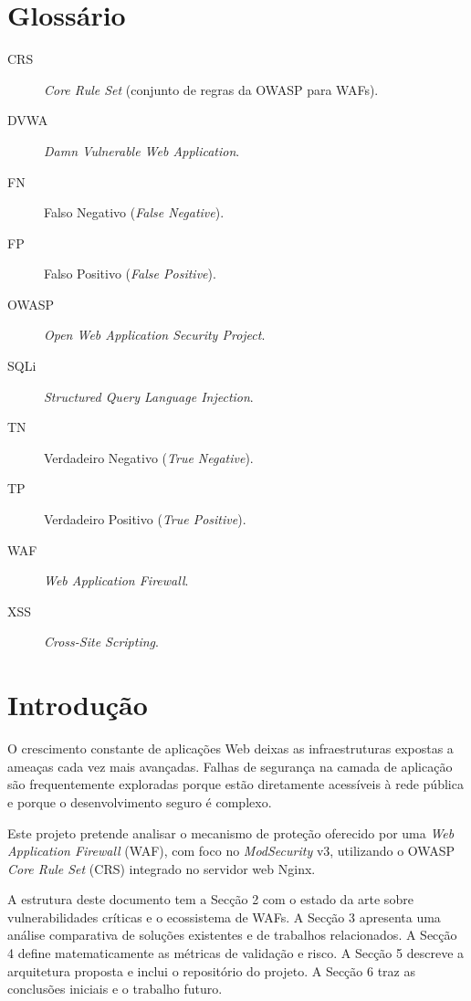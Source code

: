 \documentclass[11pt,a4paper]{article}
\begin{document}
\clearpage
\tableofcontents

\clearpage
\section*{Glossário}
\begin{description}
    \item[CRS] \textit{Core Rule Set} (conjunto de regras da OWASP para WAFs).
    \item[DVWA] \textit{Damn Vulnerable Web Application}.
    \item[FN] Falso Negativo (\textit{False Negative}).
    \item[FP] Falso Positivo (\textit{False Positive}).
    \item[OWASP] \textit{Open Web Application Security Project}.
    \item[SQLi] \textit{Structured Query Language Injection}.
    \item[TN] Verdadeiro Negativo (\textit{True Negative}).
    \item[TP] Verdadeiro Positivo (\textit{True Positive}).
    \item[WAF] \textit{Web Application Firewall}.
    \item[XSS] \textit{Cross-Site Scripting}.
\end{description}

\clearpage
\section{Introdução}
O crescimento constante de aplicações Web deixas as infraestruturas expostas a ameaças cada vez mais avançadas. Falhas de segurança na camada de aplicação são frequentemente exploradas porque estão diretamente acessíveis à rede pública e porque o desenvolvimento seguro é complexo.

Este projeto pretende analisar o mecanismo de proteção oferecido por uma \textit{Web Application Firewall} (WAF), com foco no \textit{ModSecurity} v3, utilizando o OWASP \textit{Core Rule Set} (CRS) integrado no servidor web Nginx.

A estrutura deste documento tem a Secção 2 com o estado da arte sobre vulnerabilidades críticas e o ecossistema de WAFs. A Secção 3 apresenta uma análise comparativa de soluções existentes e de trabalhos relacionados. A Secção 4 define matematicamente as métricas de validação e risco. A Secção 5 descreve a arquitetura proposta e inclui o repositório do projeto. A Secção 6 traz as conclusões iniciais e o trabalho futuro.
\end{document}
